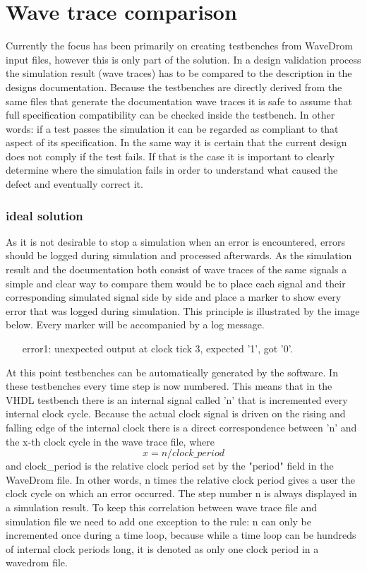 \section{Wave trace comparison}
Currently the focus has been primarily on creating testbenches from WaveDrom input files, however this is only part of the solution. In a design validation process the simulation result (wave traces) has to be compared to the description in the designs documentation.
\npar
Because the testbenches are directly derived from the same files that generate the documentation wave traces it is safe to assume that full specification compatibility can be checked inside the testbench. In other words: if a test passes the simulation it can be regarded as compliant to that aspect of its specification. In the same way it is certain that the current design does not comply if the test fails. If that is the case it is important to clearly determine where the simulation fails in order to understand what caused the defect and eventually correct it.
\subsubsection{ideal solution}\label{TD:ideal_solution}
As it is not desirable to stop a simulation when an error is encountered, errors should be logged during simulation and processed afterwards. As the simulation result and the documentation both consist of wave traces of the same signals a simple and clear way to compare them would be to place each signal and their corresponding simulated signal side by side and place a marker to show every error that was logged during simulation. This principle is illustrated by the image below.
\newpage\nline
Every marker will be accompanied by a log message.
\begin{customenv}\label{log}
	\begin{itemize}
		\item [error1:] unexpected output at clock tick 3, expected '1', got '0'.
	\end{itemize}
\end{customenv}\nline
At this point testbenches can be automatically generated by the software. In these testbenches every time step is now numbered. This means that in the VHDL testbench there is an internal signal called 'n' that is incremented every internal clock cycle. Because the actual clock signal is driven on the rising and falling edge of the internal clock there is a direct correspondence between 'n' and the x-th clock cycle in the wave trace file, where
\begin{equation}
	x = n/clock\_period
\end{equation}
and clock\_period is the relative clock period set by the "period" field in the WaveDrom file. In other words, n times the relative clock period gives a user the clock cycle on which an error occurred. The step number n is always displayed in a simulation result.
\npar
To keep this correlation between wave trace file and simulation file we need to add one exception to the rule: n can only be incremented once during a time loop, because while a time loop can be hundreds of internal clock periods long, it is denoted as only one clock period in a wavedrom file.

